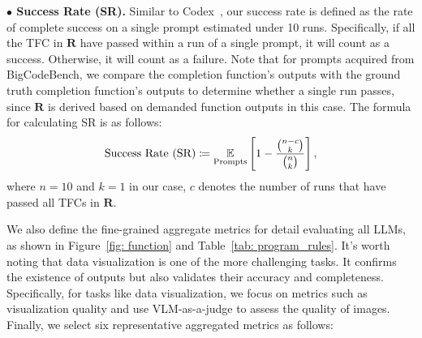 {\noindent \bf $\bullet$ Success Rate (SR).} Similar to Codex~\citep{chen2021evaluating}, our success rate is defined as the rate of complete success on a single prompt estimated under 10 runs. Specifically, if all the TFC in $\mathbf{R}$ have passed within a run of a single prompt, it will count as a success. Otherwise, it will count as a failure. Note that for prompts acquired from BigCodeBench, we compare the completion function's outputs with the ground truth completion function's outputs to determine whether a single run passes, since $\mathbf{R}$ is derived based on demanded function outputs in this case. The formula for calculating SR is as follows:
\begin{equation}
    \vspace{-0.1cm}
    \text{Success Rate (SR)} \coloneqq  \underset{\text{Prompts}}{\mathbb{E}} \left[ 1 - \frac{\binom{n-c}{k}}{\binom{n}{k}} \right],
    \vspace{-0.1cm}
\end{equation}
where $n=10$ and $k=1$ in our case, $c$ denotes the number of runs that have passed all TFCs in $\mathbf{R}$.


 We also define the fine-grained aggregate metrics for detail evaluating all LLMs, as shown in Figure~\ref{fig: function} and Table~\ref{tab: program_rules}. 
It's worth noting that data visualization is one of the more challenging tasks. It confirms the existence of outputs but also validates their accuracy and completeness.
Specifically, for tasks like data visualization, we focus on metrics such as visualization quality and use VLM-as-a-judge to assess the quality of images. Finally, we select six representative aggregated metrics as follows:

